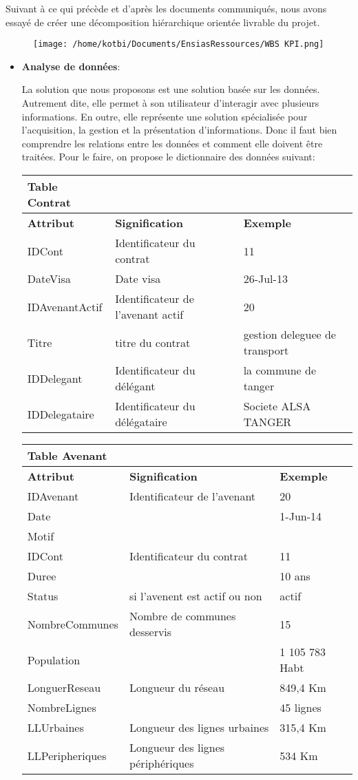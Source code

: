 \documentclass[
]{article}
\begin{document}
\begin{enumerate}
\begin{itemize}
    Suivant à ce qui précède et d'après les documents communiqués, nous
    avons essayé de créer une décomposition hiérarchique orientée
    livrable du projet.

    \begin{figure}
    \centering
    \texttt{[image: /home/kotbi/Documents/EnsiasRessources/WBS KPI.png]}
    \caption{}
    \end{figure}
  \end{itemize}

  \begin{itemize}
  \item
    \textbf{Analyse de données}:

    La solution que nous proposons est une solution basée sur les
    données. Autrement dite, elle permet à son utilisateur d'interagir
    avec plusieurs informations. En outre, elle représente une solution
    spécialisée pour l'acquisition, la gestion et la présentation
    d'informations. Donc il faut bien comprendre les relations entre les
    données et comment elle doivent être traitées. Pour le faire, on
    propose le dictionnaire des données suivant:

    \begin{longtable}[]{@{}lll@{}}
    \toprule
    Table Contrat & &\tabularnewline
    \midrule
    \endhead
    \textbf{Attribut} & \textbf{Signification} &
    \textbf{Exemple}\tabularnewline
    IDCont & Identificateur du contrat & 11\tabularnewline
    DateVisa & Date visa & 26-Jul-13\tabularnewline
    IDAvenantActif & Identificateur de l'avenant actif &
    20\tabularnewline
    Titre & titre du contrat & gestion deleguee de
    transport\tabularnewline
    IDDelegant & Identificateur du délégant & la commune de
    tanger\tabularnewline
    IDDelegataire & Identificateur du délégataire & Societe ALSA
    TANGER\tabularnewline
    \bottomrule
    \end{longtable}

    \begin{longtable}[]{@{}lll@{}}
    \toprule
    Table Avenant & &\tabularnewline
    \midrule
    \endhead
    \textbf{Attribut} & \textbf{Signification} &
    \textbf{Exemple}\tabularnewline
    IDAvenant & Identificateur de l'avenant & 20\tabularnewline
    Date & & 1-Jun-14\tabularnewline
    Motif & &\tabularnewline
    IDCont & Identificateur du contrat & 11\tabularnewline
    Duree & & 10 ans\tabularnewline
    Status & si l'avenent est actif ou non & actif\tabularnewline
    NombreCommunes & Nombre de communes desservis & 15\tabularnewline
    Population & & 1 105 783 Habt\tabularnewline
    LonguerReseau & Longueur du réseau & 849,4 Km\tabularnewline
    NombreLignes & & 45 lignes\tabularnewline
    LLUrbaines & Longueur des lignes urbaines & 315,4 Km\tabularnewline
    LLPeripheriques & Longueur des lignes périphériques & 534
    Km\tabularnewline
    \bottomrule
    \end{longtable}


\end{itemize}
\end{enumerate}
\end{document}
